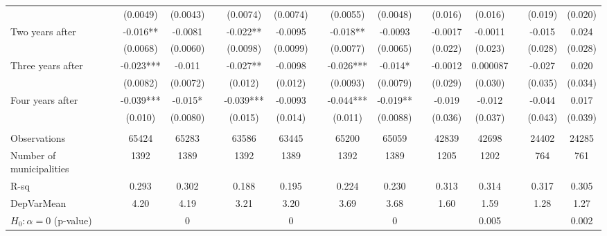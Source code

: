 \begin{tabular}{lcccccccccccccc}
      & (0.0049) & (0.0043) &       & (0.0074) & (0.0074) &       & (0.0055) & (0.0048) &       & (0.016) & (0.016) &       & (0.019) & (0.020) \\
Two years after & -0.016** & -0.0081 &       & -0.022** & -0.0095 &       & -0.018** & -0.0093 &       & -0.0017 & -0.0011 &       & -0.015 & 0.024 \\
      & (0.0068) & (0.0060) &       & (0.0098) & (0.0099) &       & (0.0077) & (0.0065) &       & (0.022) & (0.023) &       & (0.028) & (0.028) \\
Three years after & -0.023*** & -0.011 &       & -0.027** & -0.0098 &       & -0.026*** & -0.014* &       & -0.0012 & 0.000087 &       & -0.027 & 0.020 \\
      & (0.0082) & (0.0072) &       & (0.012) & (0.012) &       & (0.0093) & (0.0079) &       & (0.029) & (0.030) &       & (0.035) & (0.034) \\
Four years after & -0.039*** & -0.015* &       & -0.039*** & -0.0093 &       & -0.044*** & -0.019** &       & -0.019 & -0.012 &       & -0.044 & 0.017 \\
      & (0.010) & (0.0080) &       & (0.015) & (0.014) &       & (0.011) & (0.0088) &       & (0.036) & (0.037) &       & (0.043) & (0.039) \\
      &       &       &       &       &       &       &       &       &       &       &       &       &       &  \\
\midrule
Observations & 65424 & 65283 &       & 63586 & 63445 &       & 65200 & 65059 &       & 42839 & 42698 &       & 24402 & 24285 \\
Number of municipalities & 1392  & 1389  &       & 1392  & 1389  &       & 1392  & 1389  &       & 1205  & 1202  &       & 764   & 761 \\
R-sq  & 0.293 & 0.302 &       & 0.188 & 0.195 &       & 0.224 & 0.230 &       & 0.313 & 0.314 &       & 0.317 & 0.305 \\
DepVarMean & 4.20  & 4.19  &       & 3.21  & 3.20  &       & 3.69  & 3.68  &       & 1.60  & 1.59  &       & 1.28  & 1.27 \\
$H_0 : \alpha = 0$ (p-value) &       & 0     &       &       & 0     &       &       & 0     &       &       & 0.005 &       &       & 0.002 \\
\bottomrule
\bottomrule
\end{tabular}%
